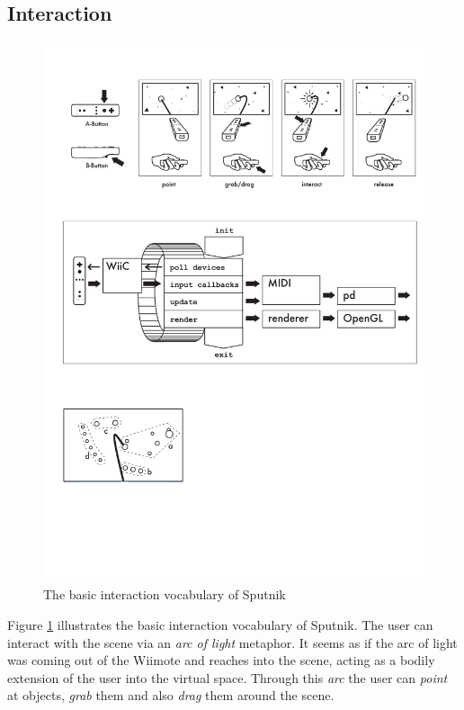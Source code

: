 \documentclass[10pt,a4paper]{scrartcl}
\begin{document}
\subsection{Interaction}

\begin{figure}[hbtp]
\begin{center}
\includegraphics[width=0.95\columnwidth]{img/sputnik-overview}
\caption{The basic interaction vocabulary of Sputnik}
\label{fig:sputnik-overview}
\end{center}
\end{figure}

Figure \ref{fig:sputnik-overview} illustrates the basic interaction vocabulary of Sputnik. The user can interact with the scene via an \emph{arc of light} metaphor. It seems as if the arc of light was coming out of the Wiimote and reaches into the scene, acting as a bodily extension of the user into the virtual space. Through this \emph{arc} the user can \emph{point} at objects, \emph{grab} them and also \emph{drag} them around the scene.
\end{document}
